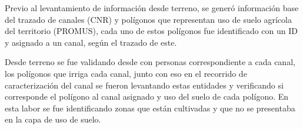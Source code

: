 \documentclass[]{article}
\begin{document}
Previo al levantamiento de información desde terreno, se generó información base del trazado de canales (CNR) y polígonos que representan uso de suelo agrícola del territorio (PROMUS), cada uno de estos polígonos fue identificado  con un ID y asignado a un canal, según el trazado de este.

Desde terreno se fue validando desde con personas correspondiente a cada canal, los polígonos que irriga cada canal, junto con eso en el recorrido de caracterización del canal se fueron levantando estas entidades y verificando si corresponde el polígono al canal asignado y uso del suelo de cada polígono. En esta labor se fue identificando zonas que están cultivadas y que no se presentaba en la capa de uso de suelo.
\end{document}
